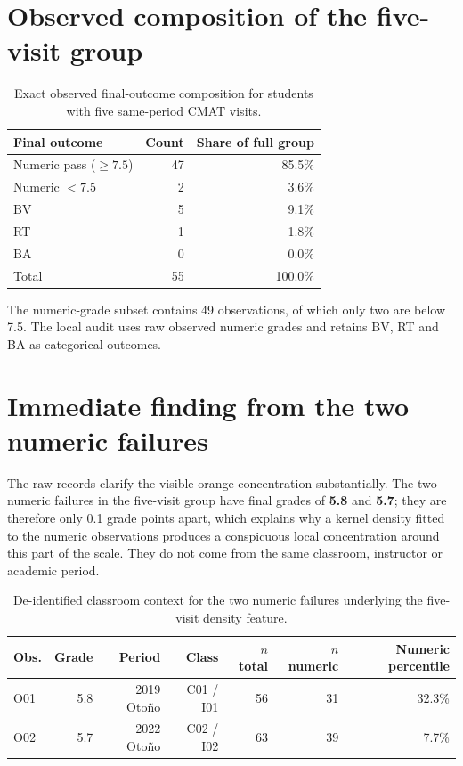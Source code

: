\documentclass[11pt]{article}
\begin{document}
\section{Observed composition of the five-visit group}
\begin{table}[H]
\centering
\caption{Exact observed final-outcome composition for students with five same-period CMAT visits.}
\begin{tabular}{lrr}
\toprule
Final outcome & Count & Share of full group \\
\midrule
Numeric pass ($\geq 7.5$) & 47 & 85.5\% \\
Numeric $<7.5$ & 2 & 3.6\% \\
BV & 5 & 9.1\% \\
RT & 1 & 1.8\% \\
BA & 0 & 0.0\% \\
\midrule
Total & 55 & 100.0\% \\
\bottomrule
\end{tabular}
\end{table}

The numeric-grade subset contains 49 observations, of which only two are below 7.5. The local audit uses raw observed numeric grades and retains BV, RT and BA as categorical outcomes.

\section{Immediate finding from the two numeric failures}

The raw records clarify the visible orange concentration substantially. The two numeric failures in the five-visit group have final grades of \textbf{5.8} and \textbf{5.7}; they are therefore only 0.1 grade points apart, which explains why a kernel density fitted to the numeric observations produces a conspicuous local concentration around this part of the scale. They do not come from the same classroom, instructor or academic period.

\begin{table}[H]
\centering
\caption{De-identified classroom context for the two numeric failures underlying the five-visit density feature.}
\begin{tabular}{lrrrrrr}
\toprule
Obs. & Grade & Period & Class & $n$ total & $n$ numeric & Numeric percentile \\
\midrule
O01 & 5.8 & 2019 Oto\~no & C01 / I01 & 56 & 31 & 32.3\% \\
O02 & 5.7 & 2022 Oto\~no & C02 / I02 & 63 & 39 & 7.7\% \\
\bottomrule
\end{tabular}
\end{table}
\end{document}
